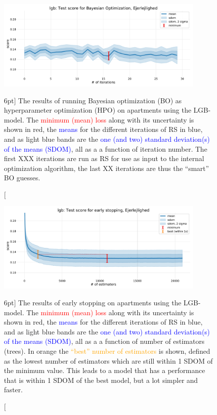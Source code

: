 \documentclass[a4paper, twoside, nobib]{tufte-book}
\newcommand{\q}[1]{``#1''}
\begin{document}
\begin{figure}
  \includegraphics[width=0.9\textwidth, trim=0 0 0 40, clip]{figures/housing/Ejerlejlighed_v17_cut_all_Ncols_all_lgb_score_over_time_BO.pdf}
  \caption[Hyperparameter optimization: Bayesian optimization results][6pt]
          {The results of running Bayesian optimization (BO) as hyperparameter optimization (HPO) on apartments using the LGB-model. The \textcolor{red}{minimum (mean) loss} along with its uncertainty is shown in red, the \textcolor{blue}{means} for the different iterations of RS in blue, and as light blue bands are the \textcolor{blue}{one (and two) standard deviation(s) of the means (SDOM)}, all as a a function of iteration number. The first XXX iterations are run as RS for use as input to the internal optimization algorithm, the last XX iterations are thus the \q{smart} BO guesses.
          } 
  \label{fig:h:BO_lgb_apartment}
\end{figure}


\begin{figure}
  \includegraphics[width=0.9\textwidth, trim=0 0 0 40, clip]{figures/housing/Ejerlejlighed_v17_cut_all_Ncols_all_lgb_early_stopping_fig.pdf}
  \caption[Early Stopping results][6pt]
          {The results of early stopping on apartments using the LGB-model. The \textcolor{red}{minimum (mean) loss} along with its uncertainty is shown in red, the \textcolor{blue}{means} for the different iterations of RS in blue, and as light blue bands are the \textcolor{blue}{one (and two) standard deviation(s) of the means (SDOM)}, all as a a function of number of estimators (trees). In orange the \textcolor{orange}{\q{best} number of estimators} is shown, defined as the lowest number of estimators which are still within 1 SDOM of the minimum value. This leads to a model that has a performance that is within 1 SDOM of the best model, but a lot simpler and faster.  
          } 
  \label{fig:h:early_stopping}
\end{figure}
\end{document}
